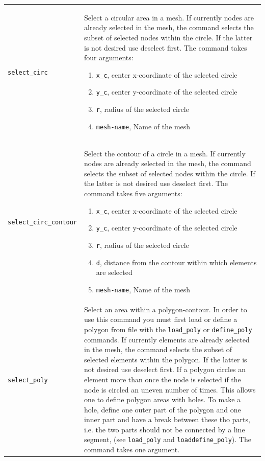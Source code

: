 \documentclass[noshowpacs,preprintnumbers,amsmath,amssymb, letter]{revtex4}
\begin{document}
\begin{longtable}{p{}p{}}
\texttt{select\_circ}	& Select a circular area in a mesh. If currently nodes are already selected in the mesh, the command selects the subset of selected nodes within the circle. If the latter is not desired use deselect first. The command takes four arguments:
\begin{enumerate}
\item \texttt{x\_c}, center x-coordinate of the selected circle
\item \texttt{y\_c}, center y-coordinate of the selected circle
\item \texttt{r}, radius of the selected circle
\item \texttt{mesh-name}, Name of the mesh
\end{enumerate}\\
\texttt{select\_circ\_contour}	& Select the contour of a circle in a mesh. If currently nodes are already selected in the mesh, the command selects the subset of selected nodes within the circle. If the latter is not desired use deselect first. The command takes five arguments:
\begin{enumerate}
\item \texttt{x\_c}, center x-coordinate of the selected circle
\item \texttt{y\_c}, center y-coordinate of the selected circle
\item \texttt{r}, radius of the selected circle
\item \texttt{d}, distance from the contour within which elements are selected
\item \texttt{mesh-name}, Name of the mesh
\end{enumerate}\\
\texttt{select\_poly}	& Select an area within a polygon-contour. In order to use this command you must first load or define a polygon from file with the \texttt{load\_poly} or \texttt{define\_poly} commands. If currently elements are already selected in the mesh, the command selects the subset of selected elements within the polygon. If the latter is not desired use deselect first. If a polygon circles an element more than once the node is selected if the node is circled an uneven number of times. This allows one to define polygon areas with holes. To make a hole, define one outer part of the polygon and one inner part and have a break between these tho parts, i.e. the two parts should not be connected by a line segment, (see \texttt{load\_poly} and \texttt{loaddefine\_poly}). The command takes one argument.

\end{longtable}
\end{document}
